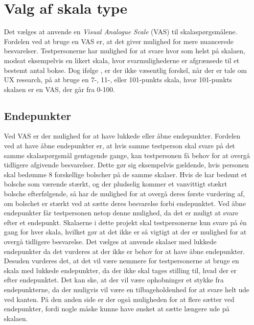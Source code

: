 \section{Valg af skala type}
\label{ParametreSkalaType}
%
Det vælges at anvende en \textit{Visual Analogue Scale} (VAS) til skalaspørgsmålene. Fordelen ved at bruge en VAS er, at det giver mulighed for mere nuancerede besvarelser. Testpersonerne har mulighed for at svare hvor som helst på skalaen, modsat eksempelvis en likert skala, hvor svarmulighederne er afgrænsede til et bestemt antal bokse.
Dog ifølge \textcite[s. 73]{PDF:RatingScales}, er der ikke væsentlig forskel, når der er tale om UX research, på at bruge en 7-, 11-, eller 101-punkts skala, hvor 101-punkts skalaen er en VAS, der går fra 0-100.
%
\subsection{Endepunkter}
Ved VAS er der mulighed for at have lukkede eller åbne endepunkter. Fordelen ved at have åbne endepunkter er, at hvis samme testperson skal svare på det samme skalaspørgsmål gentagende gange, kan testpersonen få behov for at overgå tidligere afgivende besvarelser. Dette gør sig eksempelvis gældende, hvis personen skal bedømme 8 forskellige bolscher på de samme skalaer. Hvis de har bedømt et bolsche som værende stærkt, og der pludselig kommer et vanvittigt stækrt bolsche efterfølgende, så har de mulighed for at overgå deres første vurdering af, om bolschet er stærkt ved at sætte deres besvarelse forbi endepunktet. Ved åbne endepunkter får testpersonen netop denne mulighed, da det er muligt at svare efter et endepunkt. Skalaerne i dette projekt skal testpersonerne kun svare på én gang for hver skala, hvilket gør at det ikke er så vigtigt at der er mulighed for at overgå tidligere besvarelse. \blankline
%
Det vælges at anvende skalaer med lukkede endepunkter da det vurderes at der ikke er behov for at have åbne endepunkter. Desuden vurderes det, at det vil være nemmere for testpersonerne at bruge en skala med lukkede endepunkter, da der ikke skal tages stilling til, hvad der er efter endepunktet. Det kan ske, at der vil være ophobninger et stykke fra endepunkterne, da der muligvis vil være en tilbageholdenhed for at svare helt ude ved kanten. På den anden side er der også muligheden for at flere sætter ved endepunkter, fordi nogle måske kunne have ønsket at sætte længere ude på skalaen. 
%
%
